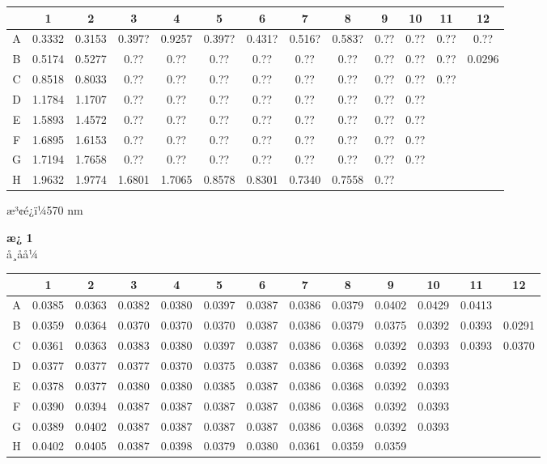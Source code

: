 \documentclass[UTF8,10pt,a4paper,fontset=fandol]{ctexart}
\begin{document}
\begin{center}
\begin{center}
\begin{center}
\scriptsize
\begin{tabular}{c|*{12}{c}}
 & 1 & 2 & 3 & 4 & 5 & 6 & 7 & 8 & 9 & 10 & 11 & 12\\
\hline
A & 0.3332 & 0.3153 & 0.397? & 0.9257 & 0.397? & 0.431? &
0.516? & 0.583? & 0.?? & 0.?? & 0.?? & 0.??\\
B & 0.5174 & 0.5277 & 0.?? & 0.?? & 0.?? & 0.?? &
0.?? & 0.?? & 0.?? & 0.?? & 0.?? & 0.0296\\
C & 0.8518 & 0.8033 & 0.?? & 0.?? & 0.?? & 0.?? &
0.?? & 0.?? & 0.?? & 0.?? & 0.?? & \\
D & 1.1784 & 1.1707 & 0.?? & 0.?? & 0.?? & 0.?? &
0.?? & 0.?? & 0.?? & 0.?? & & \\
E & 1.5893 & 1.4572 & 0.?? & 0.?? & 0.?? & 0.?? &
0.?? & 0.?? & 0.?? & 0.?? & & \\
F & 1.6895 & 1.6153 & 0.?? & 0.?? & 0.?? & 0.?? &
0.?? & 0.?? & 0.?? & 0.?? & & \\
G & 1.7194 & 1.7658 & 0.?? & 0.?? & 0.?? & 0.?? &
0.?? & 0.?? & 0.?? & 0.?? & & \\
H & 1.9632 & 1.9774 & 1.6801 & 1.7065 & 0.8578 & 0.8301 &
0.7340 & 0.7558 & 0.?? & & &
\end{tabular}
\end{center}


\vspace{1em}

æ³¢é¿ï¼570 nm

\textbf{æ¿ 1}\\
å¸åå¼

\begin{center}
\scriptsize
\begin{tabular}{c|*{12}{c}}
 & 1 & 2 & 3 & 4 & 5 & 6 & 7 & 8 & 9 & 10 & 11 & 12\\
\hline
A & 0.0385 & 0.0363 & 0.0382 & 0.0380 & 0.0397 & 0.0387 &
0.0386 & 0.0379 & 0.0402 & 0.0429 & 0.0413 & \\
B & 0.0359 & 0.0364 & 0.0370 & 0.0370 & 0.0370 & 0.0387 &
0.0386 & 0.0379 & 0.0375 & 0.0392 & 0.0393 & 0.0291\\
C & 0.0361 & 0.0363 & 0.0383 & 0.0380 & 0.0397 & 0.0387 &
0.0386 & 0.0368 & 0.0392 & 0.0393 & 0.0393 & 0.0370\\
D & 0.0377 & 0.0377 & 0.0377 & 0.0370 & 0.0375 & 0.0387 &
0.0386 & 0.0368 & 0.0392 & 0.0393 & & \\
E & 0.0378 & 0.0377 & 0.0380 & 0.0380 & 0.0385 & 0.0387 &
0.0386 & 0.0368 & 0.0392 & 0.0393 & & \\
F & 0.0390 & 0.0394 & 0.0387 & 0.0387 & 0.0387 & 0.0387 &
0.0386 & 0.0368 & 0.0392 & 0.0393 & & \\
G & 0.0389 & 0.0402 & 0.0387 & 0.0387 & 0.0387 & 0.0387 &
0.0386 & 0.0368 & 0.0392 & 0.0393 & & \\
H & 0.0402 & 0.0405 & 0.0387 & 0.0398 & 0.0379 & 0.0380 &
0.0361 & 0.0359 & 0.0359 & & &
\end{tabular}
\end{center}


\end{center}
\end{center}
\end{document}
